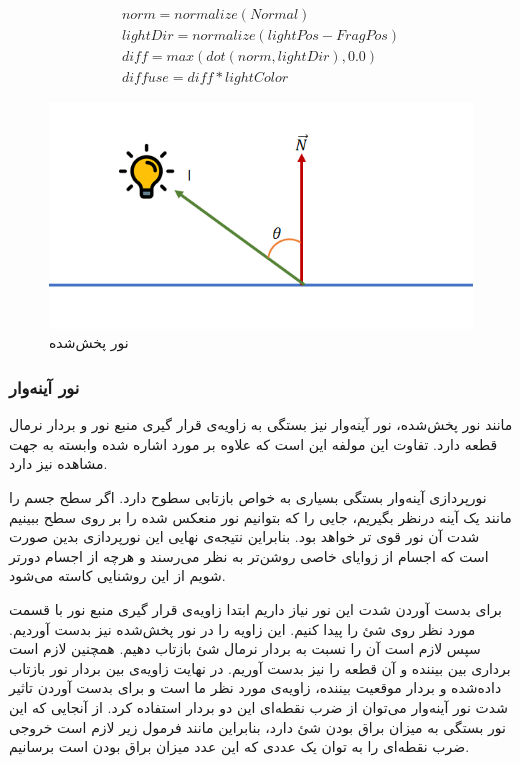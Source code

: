 \begin{gather*}
	norm = normalize(Normal) \\
	lightDir = normalize(lightPos - FragPos) \\
	diff = max(dot(norm, lightDir), 0.0) \\
	diffuse = diff * lightColor
\end{gather*}



\begin{figure}[ht]
	\centerline{\includegraphics[width=\textwidth,height=\textheight,keepaspectratio]{Figures/Ch5/DiffuseLight.png}}

	\caption{نور پخش‌شده}
	\label{fig:DiffuseLight}
\end{figure}
  

\subsubsection{نور آینه‌وار}

مانند نور پخش‌شده، نور آینه‌وار نیز بستگی به زاویه‌ی 
قرار گیری منبع نور و بردار نرمال قطعه دارد. تفاوت این 
مولفه این است که علاوه بر مورد اشاره شده وابسته به جهت مشاهده نیز دارد.

نورپردازی آینه‌وار بستگی بسیاری به خواص بازتابی سطوح دارد.
اگر سطح جسم را مانند یک آینه درنظر بگیریم، جایی را که 
بتوانیم نور منعکس شده را بر روی سطح ببینیم 
شدت آن نور قوی تر خواهد بود.
بنابراین نتیجه‌ی نهایی این نورپردازی بدین صورت است که اجسام از زوایای خاصی 
روشن‌تر به نظر می‌رسند و هرچه از اجسام دورتر شویم از این روشنایی کاسته می‌شود.

برای بدست آوردن شدت این نور نیاز داریم ابتدا زاویه‌ی قرار گیری منبع نور با قسمت مورد 
نظر روی شئ را پیدا کنیم. این زاویه را در نور پخش‌شده نیز بدست آوردیم. 
سپس لازم است آن را نسبت به بردار نرمال شئ بازتاب دهیم.
همچنین لازم است برداری بین بیننده و آن قطعه را نیز بدست آوریم.
در نهایت زاویه‌ی بین بردار نور بازتاب داده‌شده و بردار موقعیت بیننده،
زاویه‌ی مورد نظر ما است و برای بدست آوردن 
تاثیر شدت نور آینه‌وار می‌توان از ضرب نقطه‌ای این دو بردار استفاده کرد.
از آنجایی که این نور بستگی به میزان براق بودن شئ دارد، 
بنابراین مانند فرمول زیر لازم است خروجی ضرب نقطه‌ای را به توان 
یک عددی که این عدد میزان براق بودن است برسانیم.


